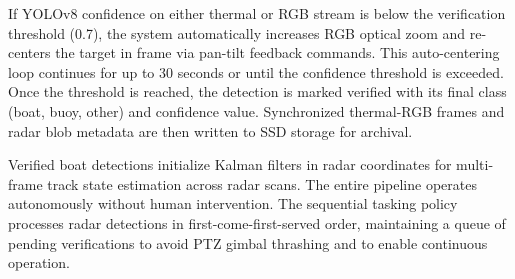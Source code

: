 \documentclass[conf]{asmeconf}
\begin{document}
If YOLOv8 confidence on either thermal or RGB stream is below the verification threshold (0.7), the system automatically increases RGB optical zoom and re-centers the target in frame via pan-tilt feedback commands. This auto-centering loop continues for up to 30 seconds or until the confidence threshold is exceeded. Once the threshold is reached, the detection is marked verified with its final class (boat, buoy, other) and confidence value. Synchronized thermal-RGB frames and radar blob metadata are then written to SSD storage for archival.

Verified boat detections initialize Kalman filters in radar coordinates for multi-frame track state estimation across radar scans. The entire pipeline operates autonomously without human intervention. The sequential tasking policy processes radar detections in first-come-first-served order, maintaining a queue of pending verifications to avoid PTZ gimbal thrashing and to enable continuous operation.
\end{document}

